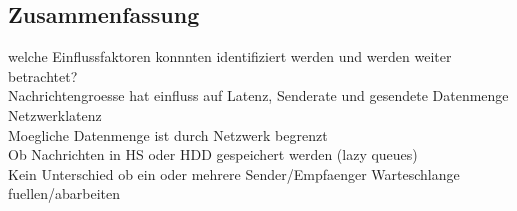 



\subsection{Zusammenfassung}
welche Einflussfaktoren konnnten identifiziert werden und werden weiter betrachtet? \\
Nachrichtengroesse hat einfluss auf Latenz, Senderate und gesendete Datenmenge \\
Netzwerklatenz \\
Moegliche Datenmenge ist durch Netzwerk begrenzt\\
Ob Nachrichten in HS oder HDD gespeichert werden (lazy queues) \\
Kein Unterschied ob ein oder mehrere Sender/Empfaenger Warteschlange fuellen/abarbeiten \\

